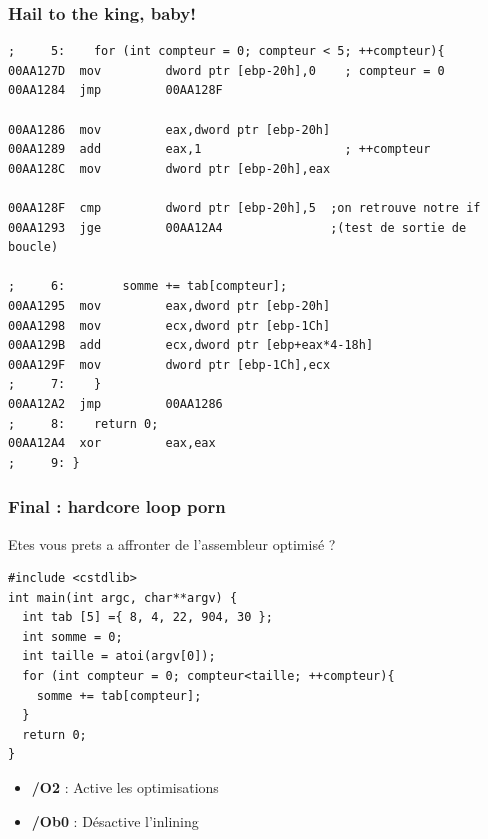 \documentclass{beamer}
\begin{document}
\begin{frame}[fragile]
\frametitle{Hail to the king, baby!}
\begin{lstlisting}[language={[x86masm]Assembler}, basicstyle={\scriptsize\ttfamily}]
;     5: 	for (int compteur = 0; compteur < 5; ++compteur){
00AA127D  mov         dword ptr [ebp-20h],0    ; compteur = 0
00AA1284  jmp         00AA128F  

00AA1286  mov         eax,dword ptr [ebp-20h]  
00AA1289  add         eax,1                    ; ++compteur
00AA128C  mov         dword ptr [ebp-20h],eax  

00AA128F  cmp         dword ptr [ebp-20h],5  ;on retrouve notre if 
00AA1293  jge         00AA12A4               ;(test de sortie de boucle)

;     6: 		somme += tab[compteur];
00AA1295  mov         eax,dword ptr [ebp-20h]  
00AA1298  mov         ecx,dword ptr [ebp-1Ch]  
00AA129B  add         ecx,dword ptr [ebp+eax*4-18h]  
00AA129F  mov         dword ptr [ebp-1Ch],ecx  
;     7: 	}
00AA12A2  jmp         00AA1286  
;     8: 	return 0;
00AA12A4  xor         eax,eax  
;     9: }
\end{lstlisting}
\end{frame}

\begin{frame}[fragile]
\frametitle{Final : hardcore loop porn}
Etes vous prets a affronter de l'assembleur optimisé ?
\begin{lstlisting}
#include <cstdlib>
int main(int argc, char**argv) {
  int tab [5] ={ 8, 4, 22, 904, 30 };
  int somme = 0;	
  int taille = atoi(argv[0]);
  for (int compteur = 0; compteur<taille; ++compteur){
    somme += tab[compteur];
  }
  return 0;
}
\end{lstlisting}
\begin{itemize}
\item \textbf{/O2} : Active les optimisations
\item \textbf{/Ob0} : Désactive l'inlining
\end{itemize}
\end{frame}
\end{document}
